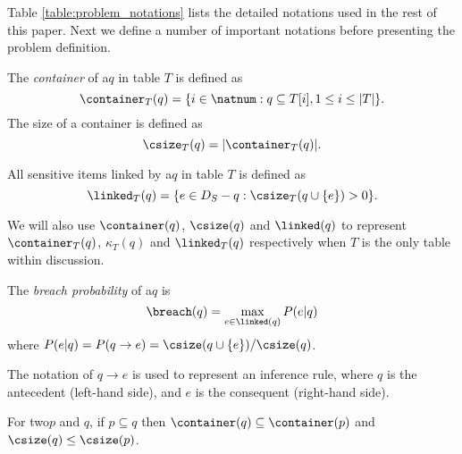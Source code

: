 
Table \ref{table:problem_notations} lists the detailed notations used in the
rest of this paper. Next we define a number of important notations before
presenting the problem definition.

\begin{definition}[Container]
The \emph{container} of a\qid $q$ in table $T$ is defined as \[ \container_T(q) = \{ i \in \natnum : q \subseteq T[i], 1 \leq i \leq |T| \} .\]
The size of a container is defined as \[ \csize_T(q) = |\container_T(q)| .\]
\end{definition}

\begin{definition}
All sensitive items linked by a\qid $q$ in table $T$ is defined as \[ \linked_T(q) = \{ e \in D_S-q : \csize_T(q\cup\{e\}) > 0 \} .\]
\end{definition}

We will also use $\container(q)$, $\csize(q)$ and $\linked(q)$ to represent $\container_T(q)$,
$\kappa_T(q)$ and $\linked_T(q)$ respectively when $T$ is the only table within discussion.

\begin{definition}
\label{def:probability}
The \emph{breach probability} of a\qid $q$ is \[ \breach(q) = \max_{e\in\linked(q)} P(e|q) \]
where $P(e|q) = P(q\rightarrow e) = \csize(q\cup \{e\})/\csize(q)$.
\end{definition}

The notation of $q\rightarrow e$ is used to represent an inference rule,
  where $q$ is the antecedent (left-hand side), and $e$ is the consequent (right-hand side).

\begin{property}
\label{prop:container_size}
For two\qids $p$ and $q$, if $p\subseteq q$ then $\container(q)\subseteq\container(p)$ and $\csize(q)\leq \csize(p)$.
\end{property}

